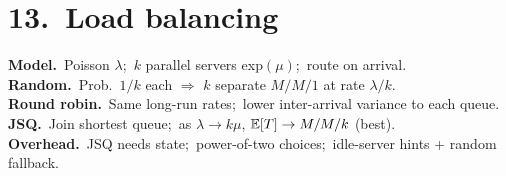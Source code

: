 \section*{13.\ Load balancing}
\textbf{Model.}\ Poisson $\lambda$;\ $k$ parallel servers exp$(\mu)$;\ route on arrival.\\
\textbf{Random.}\ Prob.\ $1/k$ each $\Rightarrow$ $k$ separate $M/M/1$ at rate $\lambda/k$.\\
\textbf{Round robin.}\ Same long-run rates;\ lower inter-arrival variance to each queue.\\
\textbf{JSQ.}\ Join shortest queue;\ as $\lambda\to k\mu$, $\mathbb{E}[T]\to M/M/k$ (best).\\
\textbf{Overhead.}\ JSQ needs state;\ power-of-two choices;\ idle-server hints + random fallback.
